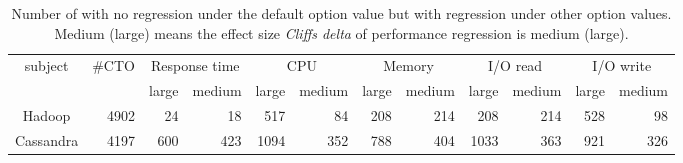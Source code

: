 \begin{table}[t]
\tabcolsep=0.08cm
\caption{Number of \instance with no regression under the default option value but with regression under other option values. Medium (large) means the effect size \emph{Cliff\textquotesingle s delta} of performance regression is medium (large).} %
    \begin{tabular}{|c|c|c|r|c|r|c|r|c|r|c|r|}
    \hline
    \multirow{2}{*}{subject} & \multirow{2}{*}{\#CTO}    & \multicolumn{2}{c|}{Response time}    & \multicolumn{2}{c|}{CPU}               & \multicolumn{2}{c|}{Memory}           & \multicolumn{2}{c|}{I/O read}          & \multicolumn{2}{c|}{I/O write}         \\ \cline{3-12} 
            &          & large   & \multicolumn{1}{c|}{medium} & large    & \multicolumn{1}{c|}{medium} & large   & \multicolumn{1}{c|}{medium} & large    & \multicolumn{1}{c|}{medium} & large    & \multicolumn{1}{c|}{medium} \\ \hline
    Hadoop  & \multicolumn{1}{r|}{4902} & \multicolumn{1}{r|}{24}  & 18         & \multicolumn{1}{r|}{517}  & 84         & \multicolumn{1}{r|}{208} & 214        & \multicolumn{1}{r|}{208}  & 214        & \multicolumn{1}{r|}{528}  & 98         \\ \hline
    Cassandra                & \multicolumn{1}{r|}{4197} & \multicolumn{1}{r|}{600} & 423        & \multicolumn{1}{r|}{1094} & 352        & \multicolumn{1}{r|}{788} & 404        & \multicolumn{1}{r|}{1033} & 363        & \multicolumn{1}{r|}{921} & 326        \\ \hline
    \end{tabular}
\label{tab:option_regression}
\end{table}

